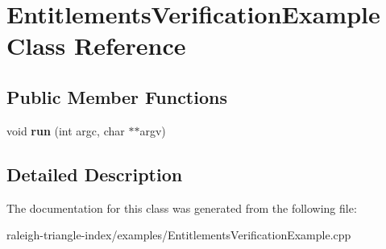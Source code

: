 \section{Entitlements\+Verification\+Example Class Reference}
\label{class_entitlements_verification_example}
\subsection*{Public Member Functions}
\begin{DoxyCompactItemize}
\item 
void {\bfseries run} (int argc, char $\ast$$\ast$argv)\label{class_entitlements_verification_example_a1bf6c627b2f2b42cf7d206f6bd5c5c89}

\end{DoxyCompactItemize}


\subsection{Detailed Description}


The documentation for this class was generated from the following file\+:\begin{DoxyCompactItemize}
\item 
raleigh-\/triangle-\/index/examples/Entitlements\+Verification\+Example.\+cpp\end{DoxyCompactItemize}
